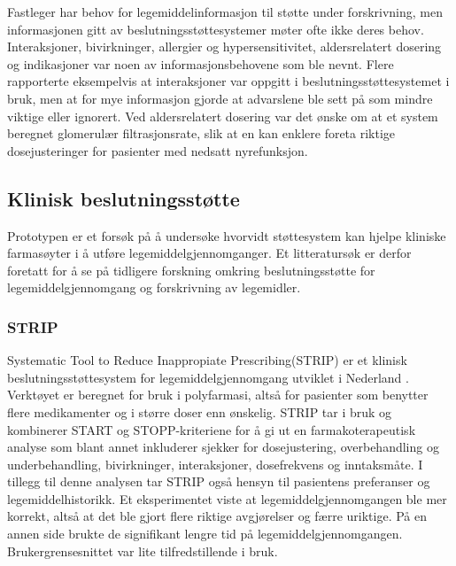 Fastleger har behov for legemiddelinformasjon til støtte under forskrivning, men informasjonen gitt av beslutningsstøttesystemer møter ofte ikke deres behov\citep{Rahmner_Eiermann_2012}. Interaksjoner, bivirkninger, allergier og hypersensitivitet, aldersrelatert dosering og indikasjoner var noen av informasjonsbehovene som ble nevnt. Flere rapporterte eksempelvis at interaksjoner var oppgitt i beslutningsstøttesystemet i bruk, men at for mye informasjon gjorde at advarslene ble sett på som mindre viktige eller ignorert.  Ved aldersrelatert dosering var det ønske om at et system beregnet glomerulær filtrasjonsrate, slik at en kan enklere foreta riktige dosejusteringer for pasienter med nedsatt nyrefunksjon. 
\subsection{Klinisk beslutningsstøtte}
Prototypen er et forsøk på å undersøke hvorvidt støttesystem kan hjelpe kliniske farmasøyter i å utføre legemiddelgjennomganger. Et litteratursøk er derfor foretatt for å se på tidligere forskning omkring beslutningsstøtte for legemiddelgjennomgang og forskrivning av legemidler.
\subsubsection{STRIP}\label{STRIP}
Systematic Tool to Reduce Inappropiate Prescribing(STRIP) er et klinisk beslutningsstøttesystem for legemiddelgjennomgang utviklet i Nederland \citep{STRIP}. Verktøyet er beregnet for bruk i polyfarmasi, altså for pasienter som benytter flere medikamenter og i større doser enn ønskelig. STRIP tar i bruk og kombinerer START og STOPP-kriteriene for å gi ut en farmakoterapeutisk analyse som blant annet inkluderer sjekker for dosejustering, overbehandling og underbehandling, bivirkninger, interaksjoner, dosefrekvens og inntaksmåte. I tillegg til denne analysen tar STRIP også hensyn til pasientens preferanser og legemiddelhistorikk. Et eksperimentet viste at legemiddelgjennomgangen ble mer korrekt, altså at det ble gjort flere riktige avgjørelser og færre uriktige. På en annen side brukte de signifikant lengre tid på legemiddelgjennomgangen. Brukergrensesnittet var lite tilfredstillende i bruk. 

